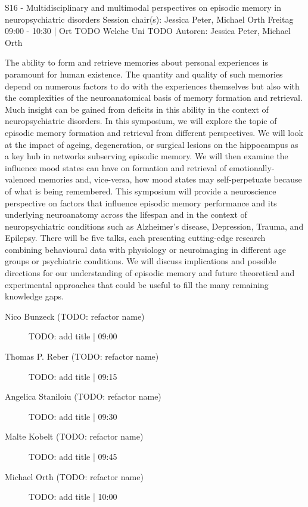 
            \begin{symposium}
            {S16 - Multidisciplinary and multimodal perspectives on episodic memory in neuropsychiatric disorders}
            {Session chair(s): Jessica Peter, Michael Orth }
            {Freitag 09:00 - 10:30 | Ort TODO}
            {Welche Uni TODO}
            Autoren: Jessica Peter, Michael Orth 

The ability to form and retrieve memories about personal experiences is paramount for human existence. The quantity and quality of such memories depend on numerous factors to do with the experiences themselves but also with the complexities of the neuroanatomical basis of memory formation and retrieval. Much insight can be gained from deficits in this ability in the context of neuropsychiatric disorders. In this symposium, we will explore the topic of episodic memory formation and retrieval from different perspectives. We will look at the impact of ageing, degeneration, or surgical lesions on the hippocampus as a key hub in networks subserving episodic memory. We will then examine the influence mood states can have on formation and retrieval of emotionally-valenced memories and, vice-versa, how mood states may self-perpetuate because of what is being remembered.
This symposium will provide a neuroscience perspective on factors that influence episodic memory performance and its underlying neuroanatomy across the lifespan and in the context of neuropsychiatric conditions such as Alzheimer’s disease, Depression, Trauma, and Epilepsy. There will be five talks, each presenting cutting-edge research combining behavioural data with physiology or neuroimaging in different age groups or psychiatric conditions. We will discuss implications and possible directions for our understanding of episodic memory and future theoretical and experimental approaches that could be useful to fill the many remaining knowledge gaps.
            \begin{description}    
            
                \item [Nico Bunzeck  (TODO: refactor name)] TODO: add title \textcolor{mygray}{ | 09:00}    
                
                \item [Thomas P. Reber (TODO: refactor name)] TODO: add title \textcolor{mygray}{ | 09:15}    
                
                \item [Angelica Staniloiu (TODO: refactor name)] TODO: add title \textcolor{mygray}{ | 09:30}    
                
                \item [Malte Kobelt (TODO: refactor name)] TODO: add title \textcolor{mygray}{ | 09:45}    
                
                \item [Michael Orth (TODO: refactor name)] TODO: add title \textcolor{mygray}{ | 10:00}    
                
            \end{description} 
            \end{symposium}
            